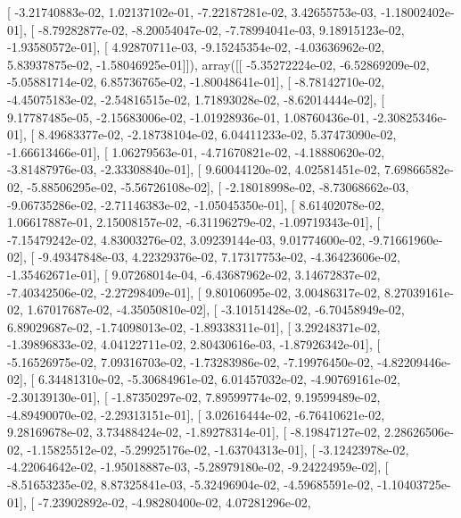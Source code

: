 \documentclass{article}
\begin{document}
       [ -3.21740883e-02,   1.02137102e-01,  -7.22187281e-02,
          3.42655753e-03,  -1.18002402e-01],
       [ -8.79282877e-02,  -8.20054047e-02,  -7.78994041e-03,
          9.18915123e-02,  -1.93580572e-01],
       [  4.92870711e-03,  -9.15245354e-02,  -4.03636962e-02,
          5.83937875e-02,  -1.58046925e-01]]), array([[ -5.35272224e-02,  -6.52869209e-02,  -5.05881714e-02,
          6.85736765e-02,  -1.80048641e-01],
       [ -8.78142710e-02,  -4.45075183e-02,  -2.54816515e-02,
          1.71893028e-02,  -8.62014444e-02],
       [  9.17787485e-05,  -2.15683006e-02,  -1.01928936e-01,
          1.08760436e-01,  -2.30825346e-01],
       [  8.49683377e-02,  -2.18738104e-02,   6.04411233e-02,
          5.37473090e-02,  -1.66613466e-01],
       [  1.06279563e-01,  -4.71670821e-02,  -4.18880620e-02,
         -3.81487976e-03,  -2.33308840e-01],
       [  9.60044120e-02,   4.02581451e-02,   7.69866582e-02,
         -5.88506295e-02,  -5.56726108e-02],
       [ -2.18018998e-02,  -8.73068662e-03,  -9.06735286e-02,
         -2.71146383e-02,  -1.05045350e-01],
       [  8.61402078e-02,   1.06617887e-01,   2.15008157e-02,
         -6.31196279e-02,  -1.09719343e-01],
       [ -7.15479242e-02,   4.83003276e-02,   3.09239144e-03,
          9.01774600e-02,  -9.71661960e-02],
       [ -9.49347848e-03,   4.22329376e-02,   7.17317753e-02,
         -4.36423606e-02,  -1.35462671e-01],
       [  9.07268014e-04,  -6.43687962e-02,   3.14672837e-02,
         -7.40342506e-02,  -2.27298409e-01],
       [  9.80106095e-02,   3.00486317e-02,   8.27039161e-02,
          1.67017687e-02,  -4.35050810e-02],
       [ -3.10151428e-02,  -6.70458949e-02,   6.89029687e-02,
         -1.74098013e-02,  -1.89338311e-01],
       [  3.29248371e-02,  -1.39896833e-02,   4.04122711e-02,
          2.80430616e-03,  -1.87926342e-01],
       [ -5.16526975e-02,   7.09316703e-02,  -1.73283986e-02,
         -7.19976450e-02,  -4.82209446e-02],
       [  6.34481310e-02,  -5.30684961e-02,   6.01457032e-02,
         -4.90769161e-02,  -2.30139130e-01],
       [ -1.87350297e-02,   7.89599774e-02,   9.19599489e-02,
         -4.89490070e-02,  -2.29313151e-01],
       [  3.02616444e-02,  -6.76410621e-02,   9.28169678e-02,
          3.73488424e-02,  -1.89278314e-01],
       [ -8.19847127e-02,   2.28626506e-02,  -1.15825512e-02,
         -5.29925176e-02,  -1.63704313e-01],
       [ -3.12423978e-02,  -4.22064642e-02,  -1.95018887e-03,
         -5.28979180e-02,  -9.24224959e-02],
       [ -8.51653235e-02,   8.87325841e-03,  -5.32496904e-02,
         -4.59685591e-02,  -1.10403725e-01],
       [ -7.23902892e-02,  -4.98280400e-02,   4.07281296e-02,
\end{document}
